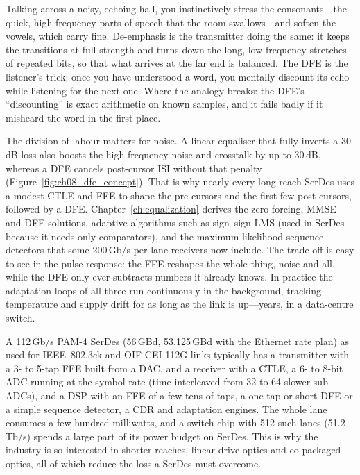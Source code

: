 \begin{analogy}
Talking across a noisy, echoing hall, you instinctively stress the consonants---the quick,
high-frequency parts of speech that the room swallows---and soften the vowels, which carry
fine. De-emphasis is the transmitter doing the same: it keeps the transitions at full strength
and turns down the long, low-frequency stretches of repeated bits, so that what arrives at
the far end is balanced. The DFE is the listener's trick: once you have understood a word, you
mentally discount its echo while listening for the next one. Where the analogy breaks: the
DFE's ``discounting'' is exact arithmetic on known samples, and it fails badly if it
misheard the word in the first place.
\end{analogy}


The division of labour matters for noise. A linear equaliser that fully inverts a 30\,dB loss
also boosts the high-frequency noise and crosstalk by up to 30\,dB, whereas a DFE cancels
post-cursor ISI without that penalty (Figure~\ref{fig:ch08_dfe_concept}). That is why nearly
every long-reach SerDes uses a modest CTLE and FFE to shape the pre-cursors and the first few
post-cursors, followed by a DFE. Chapter~\ref{ch:equalization} derives the zero-forcing, MMSE
and DFE solutions, adaptive algorithms such as sign--sign LMS (used in SerDes because it needs
only comparators), and the maximum-likelihood sequence detectors that some 200\,Gb/s-per-lane
receivers now include. The trade-off is easy to see in the pulse response: the FFE reshapes the
whole thing, noise and all, while the DFE only ever subtracts numbers it already knows. In
practice the adaptation loops of all three run continuously in the background, tracking
temperature and supply drift for as long as the link is up---years, in a data-centre switch.

\begin{inpractice}
A 112\,Gb/s PAM-4 SerDes (56\,GBd, 53.125\,GBd with the Ethernet rate plan) as used for
IEEE~802.3ck and OIF CEI-112G links typically has a transmitter with a 3- to 5-tap FFE built
from a DAC, and a receiver with a CTLE, a 6- to 8-bit ADC running at the symbol rate
(time-interleaved from 32 to 64 slower sub-ADCs), and a DSP with an FFE of a few tens of taps, a
one-tap or short DFE or a simple sequence detector, a CDR and adaptation engines. The whole
lane consumes a few hundred milliwatts, and a switch chip with 512 such lanes (51.2\,Tb/s)
spends a large part of its power budget on SerDes. This is why the industry is so interested in
shorter reaches, linear-drive optics and co-packaged optics, all of which reduce the loss a
SerDes must overcome.
\end{inpractice}

